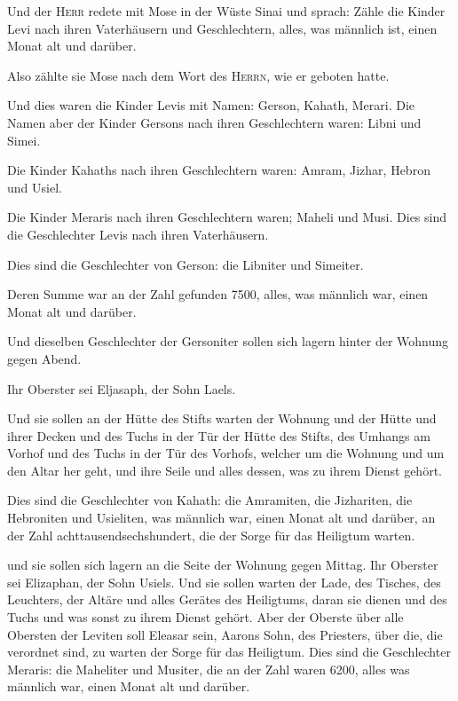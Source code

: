  Und der \textsc{Herr} redete mit Mose in der Wüste Sinai
und sprach:  Zähle die Kinder Levi nach ihren
Vaterhäusern und Geschlechtern, alles, was männlich ist, einen Monat alt
und darüber.

 Also zählte sie Mose nach dem Wort des \textsc{Herrn},
wie er geboten hatte.

 Und dies waren die Kinder Levis mit Namen: Gerson,
Kahath, Merari.  Die Namen aber der Kinder Gersons nach
ihren Geschlechtern waren: Libni und Simei.

 Die Kinder Kahaths nach ihren Geschlechtern waren:
Amram, Jizhar, Hebron und Usiel.

 Die Kinder Meraris nach ihren Geschlechtern waren;
Maheli und Musi. Dies sind die Geschlechter Levis nach ihren
Vaterhäusern.

 Dies sind die Geschlechter von Gerson: die Libniter und
Simeiter.

 Deren Summe war an der Zahl gefunden 7500, alles, was
männlich war, einen Monat alt und darüber.

 Und dieselben Geschlechter der Gersoniter sollen sich
lagern hinter der Wohnung gegen Abend.

 Ihr Oberster sei Eljasaph, der Sohn Laels.

 Und sie sollen an der Hütte des Stifts warten der
Wohnung und der Hütte und ihrer Decken und des Tuchs in der Tür der
Hütte des Stifts,  des Umhangs am Vorhof und des Tuchs in
der Tür des Vorhofs, welcher um die Wohnung und um den Altar her geht,
und ihre Seile und alles dessen, was zu ihrem Dienst gehört.

 Dies sind die Geschlechter von Kahath: die Amramiten,
die Jizhariten, die Hebroniten und Usieliten,  was
männlich war, einen Monat alt und darüber, an der Zahl
achttausendsechshundert, die der Sorge für das Heiligtum warten.

 und sie sollen sich lagern an die Seite der Wohnung
gegen Mittag.  Ihr Oberster sei Elizaphan, der Sohn
Usiels.  Und sie sollen warten der Lade, des Tisches, des
Leuchters, der Altäre und alles Gerätes des Heiligtums, daran sie dienen
und des Tuchs und was sonst zu ihrem Dienst gehört.  Aber
der Oberste über alle Obersten der Leviten soll Eleasar sein, Aarons
Sohn, des Priesters, über die, die verordnet sind, zu warten der Sorge
für das Heiligtum.  Dies sind die Geschlechter Meraris:
die Maheliter und Musiter,  die an der Zahl waren 6200,
alles was männlich war, einen Monat alt und darüber.

